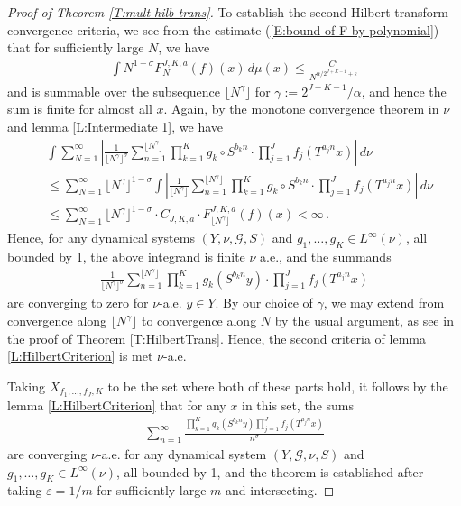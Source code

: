 \documentclass[11pt, oneside]{amsart}   	%
\newcommand{\ep}{\varepsilon}
\newcommand{\1}{\mathbbm{1}}
\newcommand{\floor}[1]{\lfloor#1\rfloor}
\theoremstyle{definition}
\begin{document}
\begin{proof}[Proof of Theorem \ref{T:mult hilb trans}]
To establish the second Hilbert transform convergence criteria, we see from the estimate (\ref{E:bound of F by polynomial}) that for sufficiently large $N$, we have
\begin{align*}
 \int  N^{1-\sigma} F_N^{J, K, a}(f) (x) \, d\mu(x) \leq \frac{C'}{N^{\alpha/2^{J+K-1} + \ep}}
\end{align*}
and is summable over the subsequence $\floor{N^\gamma}$ for $\gamma := 2^{J+K-1}/\alpha$, and hence the sum is finite for almost all $x$. Again, by the monotone convergence theorem in $\nu$ and lemma \ref{L:Intermediate 1}, we have
\begin{align*}
&\int \sum_{N=1}^\infty \left|\frac{1}{\floor{N^\gamma}^\sigma} \sum_{n=1}^{\floor{N^\gamma}} \prod_{k=1}^K g_k\circ S^{b_k n}\cdot \prod_{j=1}^J f_j(T^{a_j n}x)\right| \, d\nu \\
&\leq \sum_{N=1}^\infty   \floor{N^\gamma}^{1-\sigma}\int \left|\frac{1}{\floor{N^\gamma}} \sum_{n=1}^{\floor{N^\gamma}} \prod_{k=1}^K g_k\circ S^{b_k n}\cdot \prod_{j=1}^J f_j(T^{a_j n}x)\right| \, d\nu \\
&\leq  \sum_{N=1}^\infty  \floor{N^\gamma}^{1-\sigma} \cdot C_{J, K, a} \cdot F_{\floor{N^\gamma}}^{J, K, a} (f)(x) <\infty \, .
\end{align*}
Hence, for any dynamical systems $(Y, \nu, \mathcal{G}, S)$ and $g_1, \dots, g_K\in L^\infty(\nu)$, all bounded by 1, the above integrand is finite $\nu$ a.e., and the summands 
\begin{align*}
\frac{1}{\floor{N^\gamma}^\sigma} \sum_{n=1}^{\floor{N^\gamma}} \prod_{k=1}^K g_k( S^{b_k n}y)\cdot \prod_{j=1}^J f_j(T^{a_j n}x)
\end{align*}
are converging to zero for $\nu$-a.e. $y\in Y$. By our choice of $\gamma$, we may extend from convergence along $\floor{N^\gamma}$ to convergence along $N$ by the usual argument, as see in the proof of Theorem \ref{T:HilbertTrans}. Hence, the second criteria of lemma \ref{L:HilbertCriterion} is met $\nu$-a.e.

Taking $X_{f_1, \dots, f_J, K}$ to be the set where both of these parts hold, it follows by the lemma \ref{L:HilbertCriterion} that for any $x$ in this set, the sums
\begin{align*}
\sum_{n=1}^\infty \frac{\prod_{k=1}^K g_{k} (S^{b_k n} y) \prod_{j=1}^J f_{j} (T^{a_j n} x)}{n^\sigma}
\end{align*}
are converging $\nu$-a.e. for any dynamical system $(Y, \mathcal{G}, \nu, S)$ and $g_1, \dots, g_K\in L^\infty(\nu)$, all bounded by 1, and the theorem is established after taking $\ep = 1/m$ for sufficiently large $m$ and intersecting.
\end{proof}
\end{document}
